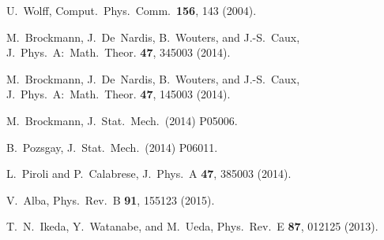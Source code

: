 \documentclass[11pt]{iopart}
\begin{document}
\begin{thebibliography}{99}
U.~Wolff, Comput.\ Phys.\ Comm.\ {\bf 156}, 143 (2004). 

M.~Brockmann, J.~De~Nardis, B.~Wouters, and J.-S.~Caux, J.\ Phys.\ A:\ 
Math.\ Theor. {\bf 47}, 345003 (2014). 

M.~Brockmann, J.~De~Nardis, B.~Wouters, and J.-S.~Caux, J.\ Phys.\ A:\ 
Math.\ Theor. {\bf 47}, 145003 (2014). 

M.~Brockmann, J.\ Stat.\ Mech.\ (2014) P05006. 

B.~Pozsgay, J.\ Stat.\ Mech.\ (2014) P06011. 

L.~Piroli and P.~Calabrese, J.\ Phys.\ A {\bf 47}, 385003 (2014). 

V.~Alba, Phys.\ Rev.\ B {\bf 91}, 155123 (2015). 

T.~N.~Ikeda, Y.~Watanabe, and M.~Ueda, Phys.\ Rev.\ E {\bf 87}, 012125 (2013). 

\end{thebibliography}
\end{document}
